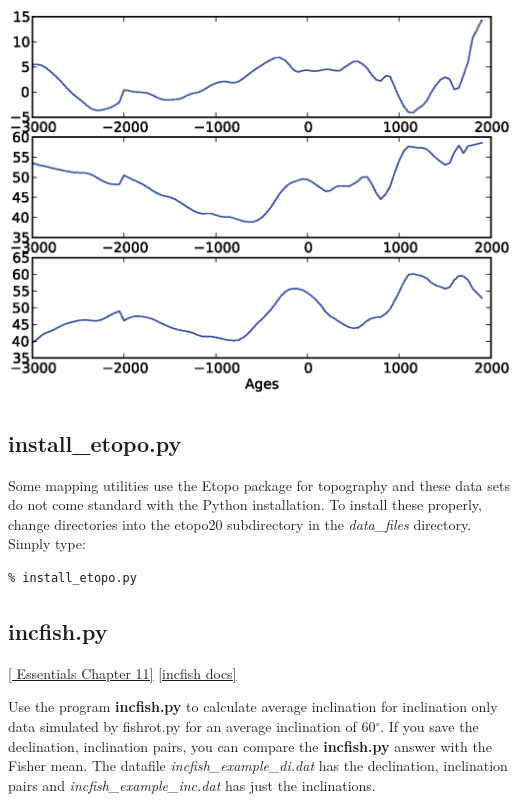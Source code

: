 \documentclass[11pt]{book}
\begin{document}
{{  \includegraphics[width=15cm]{EPSfiles/igrf.eps}


\subsection{install\_etopo.py}

Some  mapping utilities use the Etopo package for topography and these data sets do not come standard with the Python installation.  To install these properly, change directories into the etopo20 subdirectory in the {\it data\_files } directory.  Simply type:

\begin{verbatim}
% install_etopo.py
\end{verbatim}







\subsection{incfish.py}
\href{http://earthref.org/MAGIC/books/Tauxe/Essentials/WebBook3ch11.html#ch11}{ [ Essentials Chapter 11]}
\href{https://github.com/PmagPy/PmagPy/blob/master/programs/incfish.py}{[incfish docs]}

Use the program {\bf incfish.py} to calculate average inclination for inclination only data
simulated by fishrot.py for an average inclination of 60$^{\circ}$.   If you save the declination, inclination
pairs, you can compare the {\bf incfish.py} answer with the Fisher mean.    The datafile {\it incfish\_example\_di.dat} has the declination, inclination pairs and {\it incfish\_example\_inc.dat} has just the inclinations.

}}
\end{document}
